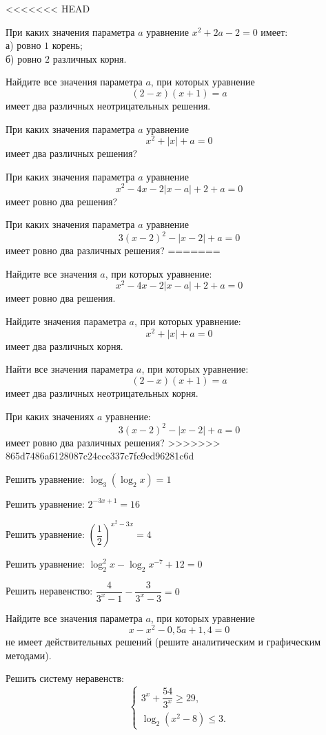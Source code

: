 \begin{class}[number=6]
	\begin{listofex}
<<<<<<< HEAD
		\item При каких значения параметра \( a \) уравнение \( x^2+2a-2=0 \) имеет:\\
		а) ровно \( 1 \) корень;\\
		б) ровно \( 2 \) различных корня.
		\item Найдите все значения параметра \( a \), при которых уравнение
		\[ (2-x)(x+1)=a \]
		имеет два различных неотрицательных решения.
		\item При каких значения параметра \( a \) уравнение
		\[ x^2+|x|+a=0 \]
		имеет два различных решения?
		\item При каких значения параметра \( a \) уравнение
		\[ x^2-4x-2|x-a|+2+a=0 \]
		имеет ровно два решения?
		\item При каких значения параметра \( a \) уравнение
		\[ 3(x-2)^2 - |x-2|+a=0 \]
		имеет ровно два различных решения?
=======
		\item Найдите все значения \(a\), при которых уравнение: \[ x^2-4x-2|x-a|+2+a=0 \] имеет ровно два решения.
		\item Найдите значения параметра \(a\), при которых уравнение: \[ x^2+|x|+a=0 \] имеет два различных корня.
		\item Найти все значения параметра \(a\), при которых уравнение: \[(2-x)(x+1)=a\] имеет два различных неотрицательных корня.
		\item При каких значениях \(a\) уравнение: \[ 3(x-2)^2 - |x-2|+a=0 \] имеет ровно два различных решения?
>>>>>>> 865d7486a6128087c24cce337c7fe9ed96281c6d
	\end{listofex}
\end{class}

\begin{homework}[number=3]
	\begin{listofex}
		\item Решить уравнение: \( \log_3(\log_2x)=1 \)
		\item Решить уравнение: \( 2^{-3x+1}=16 \)
		\item Решить уравнение: \( \left( \dfrac{1}{2} \right)^{x^2-3x}=4\)
		\item Решить уравнение: \( \log^2_2x-\log_2x^{-7}+12=0 \)
		\item Решить неравенство: \( \dfrac{4}{3^x-1}-\dfrac{3}{3^x-3}=0 \)
		\item Найдите все значения параметра \( a \), при которых уравнение
		\[ x-x^2-0,5a+1,4=0 \]
		не имеет действительных решений (решите аналитическим и графическим методами).
		\item Решить систему неравенств:
		\[ \left\{
		\begin{array}{l}
			3^x+\dfrac{54}{3^x}\ge29,\\
			\log_2(x^2-8)\le3.
		\end{array}
		\right. \]
	\end{listofex}
\end{homework}

